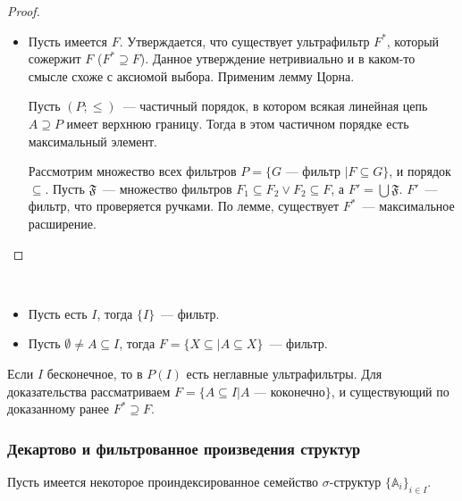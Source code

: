 \begin{proof}
\begin{itemize}
        \item Пусть имеется $F$. Утверждается, что существует ультрафильтр $F^*$, который сожержит $F$ ($F^* \supseteq F$). Данное утверждение нетривиально и в каком-то смысле схоже с аксиомой выбора. Применим лемму Цорна. 
        
        \begin{lemma}[Цорн]
            Пусть $(P; \leq)$~— частичный порядок, в котором всякая линейная цепь $A \supseteq P$ имеет верхнюю границу. Тогда в этом частичном порядке есть максимальный элемент. 
        \end{lemma} 

        Рассмотрим множество всех фильтров $P = \{G\text{~— фильтр }| F \subseteq G\}$, и порядок $\subseteq$. Пусть $\mathfrak{F}$~— множество фильтров $F_1 \subseteq F_2 \vee F_2 \subseteq F$, а $F' = \bigcup \mathfrak{F}$. $F'$~— фильтр, что проверяется ручками. По лемме, существует $F^*$~— максимальное расширение. 
    \end{itemize}
\end{proof} 

\begin{exmpl} \ 
    \begin{itemize}
        \item Пусть есть $I$, тогда $\{I\}$~— фильтр. 
        \item Пусть $\emptyset \neq A \subseteq I$, тогда $F = \{X \subseteq | A \subseteq X\}$~— фильтр.
    \end{itemize}
\end{exmpl}

\begin{task}
    Если $I$ бесконечное, то в $P(I)$ есть неглавные ультрафильтры. Для доказательства рассматриваем $F = \{A \subseteq I | A\text{~— коконечно}\}$, и существующий по доказанному ранее $F^* \supseteq F$. 
\end{task} 

\subsubsection{Декартово и фильтрованное произведения структур} 

Пусть имеется некоторое проиндексированное семейство $\sigma$-структур $\{\mathbb{A}_i\}_{i \in I}$.

